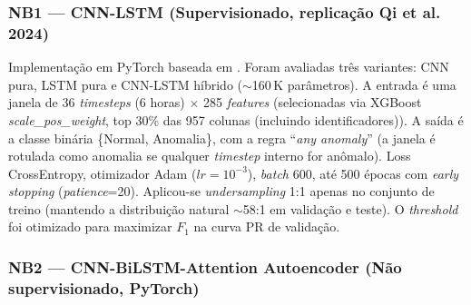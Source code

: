 \documentclass[12pt]{article}
\begin{document}
\begin{table}[!ht]
\centering
\small
{}
\caption{Visão geral dos cinco notebooks implementados.}
\label{tab:resumo_notebooks}
\end{table}

\subsubsection{NB1 --- CNN-LSTM (Supervisionado, replicação Qi et al. 2024)}

Implementação em PyTorch baseada em \citet{Qi2024_CNN_LSTM_Energies}. Foram avaliadas três variantes: CNN pura, LSTM pura e CNN-LSTM híbrido ($\sim$160\,K parâmetros). A entrada é uma janela de 36 \textit{timesteps} (6 horas) $\times$ 285 \textit{features} (selecionadas via XGBoost \textit{scale\_pos\_weight}, top 30\% das 957 colunas (incluindo identificadores)). A saída é a classe binária \{Normal, Anomalia\}, com a regra ``\textit{any anomaly}'' (a janela é rotulada como anomalia se qualquer \textit{timestep} interno for anômalo). Loss CrossEntropy, otimizador Adam ($lr=10^{-3}$), \textit{batch} 600, até 500 épocas com \textit{early stopping} (\textit{patience}=20). Aplicou-se \textit{undersampling} 1:1 apenas no conjunto de treino (mantendo a distribuição natural $\sim$58:1 em validação e teste). O \textit{threshold} foi otimizado para maximizar $F_1$ na curva PR de validação.

\subsubsection{NB2 --- CNN-BiLSTM-Attention Autoencoder (Não supervisionado, PyTorch)}
\end{document}

